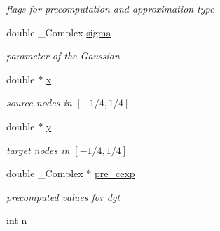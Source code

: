 \begin{CompactItemize}
\begin{CompactList}\small\item\em flags for precomputation and approximation type \item\end{CompactList}\item 
\hypertarget{structfgt__plan_f6e97b6f971e4f89ceeac2bca9d69666}{
double \_\-Complex \hyperlink{structfgt__plan_f6e97b6f971e4f89ceeac2bca9d69666}{sigma}}
\label{structfgt__plan_f6e97b6f971e4f89ceeac2bca9d69666}

\begin{CompactList}\small\item\em parameter of the Gaussian \item\end{CompactList}\item 
\hypertarget{structfgt__plan_c264aff49bf16f52fa94ebd9e559fc93}{
double $\ast$ \hyperlink{structfgt__plan_c264aff49bf16f52fa94ebd9e559fc93}{x}}
\label{structfgt__plan_c264aff49bf16f52fa94ebd9e559fc93}

\begin{CompactList}\small\item\em source nodes in $[-1/4,1/4]$ \item\end{CompactList}\item 
\hypertarget{structfgt__plan_f80c5936eb966c0300dd3e5042b74056}{
double $\ast$ \hyperlink{structfgt__plan_f80c5936eb966c0300dd3e5042b74056}{y}}
\label{structfgt__plan_f80c5936eb966c0300dd3e5042b74056}

\begin{CompactList}\small\item\em target nodes in $[-1/4,1/4]$ \item\end{CompactList}\item 
\hypertarget{structfgt__plan_d7d9387df7df72e3d5d628d7e429c2a2}{
double \_\-Complex $\ast$ \hyperlink{structfgt__plan_d7d9387df7df72e3d5d628d7e429c2a2}{pre\_\-cexp}}
\label{structfgt__plan_d7d9387df7df72e3d5d628d7e429c2a2}

\begin{CompactList}\small\item\em precomputed values for dgt \item\end{CompactList}\item 
\hypertarget{structfgt__plan_2e6ad196b67db3b9811fdb8e777633b1}{
int \hyperlink{structfgt__plan_2e6ad196b67db3b9811fdb8e777633b1}{n}}
\label{structfgt__plan_2e6ad196b67db3b9811fdb8e777633b1}


\end{CompactItemize}
